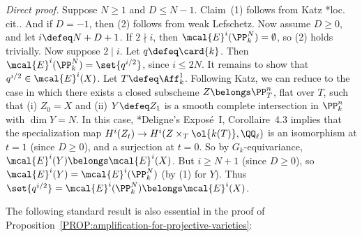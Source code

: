 \documentclass[12pt]{report}
\begin{document}
{\emph{Direct proof.}
Suppose $N\geq 1$ and $D\leq N-1$.
Claim~(1) follows from Katz \cite{hooley1991number}*{loc. cit.}.
And if $D = -1$, then (2) follows from weak Lefschetz.
Now assume $D\geq 0$, and let $i\defeq N+D+1$.
If $2\nmid i$, then $\mcal{E}^i(\PP^{N}_k) = \emptyset$, so (2) holds trivially.
Now suppose $2\mid i$.
Let $q\defeq \card{k}$.
Then $\mcal{E}^i(\PP^{N}_k) = \set{q^{i/2}}$, since $i\leq 2N$.
It remains to show that $q^{i/2}\in \mcal{E}^i(X)$.
Let $T\defeq \Aff^1_k$.
Following Katz, we can reduce to the case in which there exists
a closed subscheme $Z\belongs \PP^n_T$, flat over $T$, such that (i) $Z_0 = X$ and (ii) $Y\defeq Z_1$ is a smooth complete intersection in $\PP^n_k$ with $\dim{Y} = N$.
In this case, \cite{grothendieck1972groupes}*{Deligne's Expos\'{e}~I, Corollaire~4.3} implies that the specialization map $H^i(Z_t)\to H^i(Z\times_{T} \ol{k(T)}, \QQ_\ell)$ is an isomorphism at $t=1$ (since $D\geq 0$), and a surjection at $t=0$.
So by $G_k$-equivariance, $\mcal{E}^i(Y)\belongs \mcal{E}^i(X)$.
But $i\geq N+1$ (since $D\geq 0$), so $\mcal{E}^i(Y) = \mcal{E}^i(\PP^{N}_k)$ (by (1) for $Y$).
Thus $\set{q^{i/2}} = \mcal{E}^i(\PP^{N}_k)\belongs \mcal{E}^i(X)$.
}

The following standard result is also essential in the proof of Proposition~\ref{PROP:amplification-for-projective-varieties}:

\end{document}
